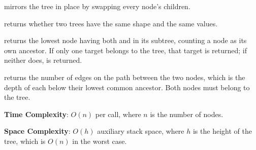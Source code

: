 \begin{compactitem}
  \item {} mirrors the tree in place by swapping every node's children.
  \item {} returns whether two trees have the same shape and the same values.
  \item {} returns the lowest node having both  and  in its subtree, counting a node as its own ancestor. If only one target belongs to the tree, that target is returned; if neither does,  is returned.
  \item {} returns the number of edges on the path between the two nodes, which is the depth of each below their lowest common ancestor. Both nodes must belong to the tree.
\end{compactitem}

\textbf{Time Complexity}: $O(n)$ per call, where $n$ is the number of nodes.

\textbf{Space Complexity}: $O(h)$ auxiliary stack space, where $h$ is the height of the tree, which is $O(n)$ in the worst case.

